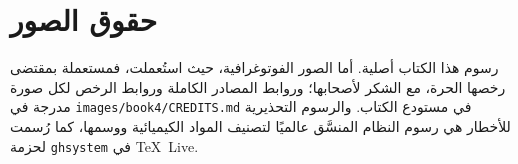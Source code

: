 \chapter*{حقوق الصور}

رسوم هذا الكتاب أصلية. أما الصور الفوتوغرافية، حيث استُعملت، فمستعملة
بمقتضى رخصها الحرة، مع الشكر لأصحابها؛ وروابط المصادر الكاملة وروابط
الرخص لكل صورة مدرجة في
\texttt{images/book4/CREDITS.md} في مستودع الكتاب.
والرسوم التحذيرية للأخطار هي رسوم النظام المنسَّق عالميًا لتصنيف
المواد الكيميائية ووسمها، كما رُسمت لحزمة
\texttt{ghsystem} في \TeX\ Live.

